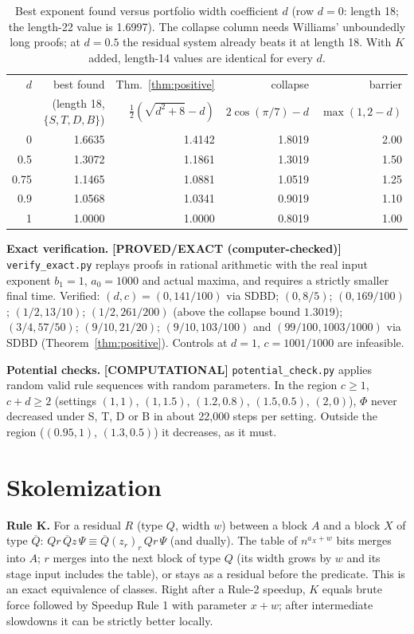 \documentclass[11pt]{article}
\theoremstyle{definition}
\theoremstyle{remark}
\newcommand{\status}[1]{\textbf{[#1]}}
\begin{document}
\begin{table}[h]
\centering
\small
\begin{tabular}{rrrrr}
$d$ & best found & Thm.~\ref{thm:positive} & collapse & barrier \\
    & (length 18, $\{S,T,D,B\}$) & $\tfrac12(\sqrt{d^2+8}-d)$ & $2\cos(\pi/7)-d$ & $\max(1,2-d)$ \\ \hline
0    & 1.6635 & 1.4142 & 1.8019 & 2.00 \\
0.5  & 1.3072 & 1.1861 & 1.3019 & 1.50 \\
0.75 & 1.1465 & 1.0881 & 1.0519 & 1.25 \\
0.9  & 1.0568 & 1.0341 & 0.9019 & 1.10 \\
1    & 1.0000 & 1.0000 & 0.8019 & 1.00 \\
\end{tabular}
\caption{Best exponent found versus portfolio width coefficient $d$ (row $d=0$: length 18; the length-22
value is 1.6997). The collapse column needs Williams' unboundedly long proofs; at $d=0.5$ the residual
system already beats it at length 18. With $K$ added, length-14 values are identical for every $d$.}
\label{tab:curve}
\end{table}

\noindent\textbf{Exact verification.} \status{PROVED/EXACT (computer-checked)}
\texttt{verify\_exact.py} replays proofs in rational arithmetic with the real input exponent $b_1=1$,
$a_0=1000$ and actual maxima, and requires a strictly smaller final time. Verified:
$(d,c)=(0,141/100)$ via SDBD; $(0,8/5)$; $(0,169/100)$; $(1/2,13/10)$; $(1/2,261/200)$ (above the collapse
bound $1.3019$); $(3/4,57/50)$; $(9/10,21/20)$; $(9/10,103/100)$ and $(99/100,1003/1000)$ via SDBD
(Theorem~\ref{thm:positive}). Controls at $d=1$, $c=1001/1000$ are infeasible.

\noindent\textbf{Potential checks.} \status{COMPUTATIONAL}
\texttt{potential\_check.py} applies random valid rule sequences with random parameters. In the region
$c\ge1$, $c+d\ge2$ (settings $(1,1)$, $(1,1.5)$, $(1.2,0.8)$, $(1.5,0.5)$, $(2,0)$), $\Phi$ never decreased
under S, T, D or B in about 22,000 steps per setting. Outside the region ($(0.95,1)$, $(1.3,0.5)$) it
decreases, as it must.

\section{Skolemization}\label{sec:skolem}

\noindent\textbf{Rule K.} For a residual $R$ (type $Q$, width $w$) between a block $A$ and a block $X$ of
type $\overline Q$: $Qr\,\overline Q z\,\Psi\equiv\overline Q(z_r)_r\,Qr\,\Psi$ (and dually). The table of
$n^{a_X+w}$ bits merges into $A$; $r$ merges into the next block of type $Q$ (its width grows by $w$ and
its stage input includes the table), or stays as a residual before the predicate. This is an exact
equivalence of classes. Right after a Rule-2 speedup, $K$ equals brute force followed by Speedup Rule 1
with parameter $x+w$; after intermediate slowdowns it can be strictly better locally.
\end{document}
